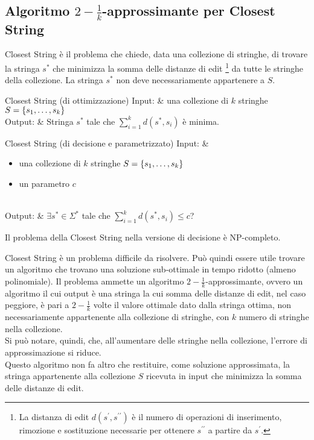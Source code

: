 \subsection{Algoritmo $2-\frac{1}{k}$-approssimante per Closest String}
Closest String è il problema che chiede, data una collezione di stringhe,
di trovare la stringa $s^*$ che minimizza la somma delle distanze di edit
\footnote{La distanza di edit $d(s^{\prime}, s^{\prime\prime})$ è
il numero di operazioni di inserimento, rimozione e sostituzione necessarie
per ottenere $s^{\prime\prime}$ a partire da $s^{\prime}$.} da tutte le
stringhe della collezione.
La stringa $s^*$ non deve necessariamente appartenere a $S$.

\begin{problem}[lined]{Closest String (di ottimizzazione)}
    Input: & una collezione di $k$ stringhe $S = \left\{s_1, \ldots, s_k\right\}$\\
    Output: & Stringa $s^*$ tale che $\sum\limits_{i=1}^k d(s^*, s_i)$ è minima.
\end{problem}

\begin{problem}[lined]{Closest String (di decisione e parametrizzato)}
    Input: & \begin{minipage}[t]{0.8\linewidth}\begin{itemize}
        \setlength\itemsep{0em}
        \item una collezione di $k$ stringhe $S = \left\{s_1, \ldots, s_k\right\}$
        \item un parametro $c$
    \end{itemize}\end{minipage}\\
    Output: & $\exists s^* \in \Sigma^*$ tale che
    $\sum\limits_{i=1}^k d(s^*, s_i) \le c$?
\end{problem}

Il problema della Closest String nella versione di decisione è NP-completo.

Closest String è un problema difficile da risolvere. Può quindi
essere utile trovare un algoritmo che trovano una soluzione sub-ottimale
in tempo ridotto (almeno polinomiale).
Il problema ammette
un algoritmo $2-\frac{1}{k}$-approssimante, ovvero un
algoritmo il cui output è una stringa la cui somma delle distanze di edit,
nel caso peggiore, è pari a $2-\frac{1}{k}$ volte il valore
ottimale dato dalla stringa ottima, non necessariamente appartenente alla
collezione di stringhe,
con $k$ numero di stringhe nella collezione.\\
Si può notare, quindi, che, all'aumentare delle stringhe nella collezione,
l'errore di approssimazione si riduce.\\
Questo algoritmo non fa altro che restituire, come soluzione approssimata,
la stringa appartenente alla collezione $S$ ricevuta in input che minimizza
la somma delle distanze di edit.


